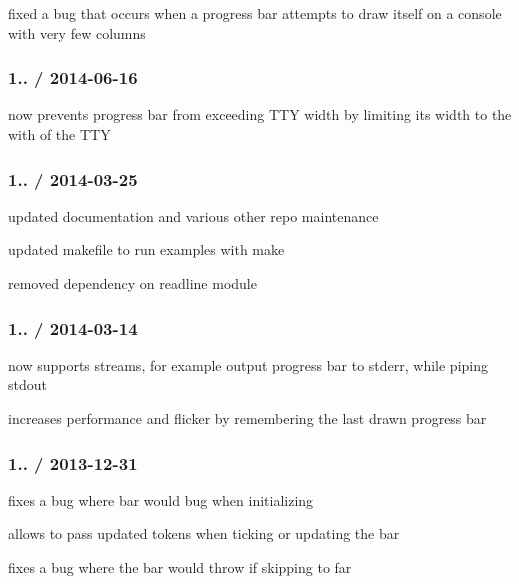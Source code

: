 
\begin{DoxyItemize}
\item fixed a bug that occurs when a progress bar attempts to draw itself on a console with very few columns
\end{DoxyItemize}

\subsubsection*{1.. / 2014-\/06-\/16}


\begin{DoxyItemize}
\item now prevents progress bar from exceeding T\+T\+Y width by limiting its width to the with of the T\+T\+Y
\end{DoxyItemize}

\subsubsection*{1.. / 2014-\/03-\/25}


\begin{DoxyItemize}
\item updated documentation and various other repo maintenance
\item updated makefile to run examples with {\ttfamily make}
\item removed dependency on readline module
\end{DoxyItemize}

\subsubsection*{1.. / 2014-\/03-\/14}


\begin{DoxyItemize}
\item now supports streams, for example output progress bar to stderr, while piping stdout
\item increases performance and flicker by remembering the last drawn progress bar
\end{DoxyItemize}

\subsubsection*{1.. / 2013-\/12-\/31}


\begin{DoxyItemize}
\item fixes a bug where bar would bug when initializing
\item allows to pass updated tokens when ticking or updating the bar
\item fixes a bug where the bar would throw if skipping to far
\end{DoxyItemize}

